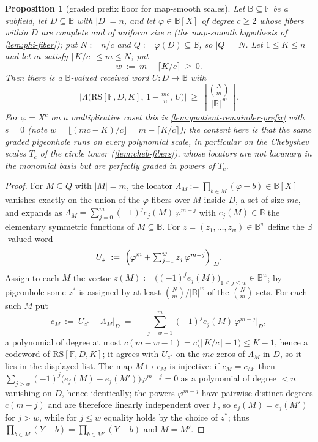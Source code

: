 \documentclass[11pt]{article}
\newtheorem{proposition}[proposition]{Proposition}
\theoremstyle{definition}
\theoremstyle{remark}
\newcommand{\F}{\mathbb{F}}
\newcommand{\B}{\mathbb{B}}
\newcommand{\RS}{\mathrm{RS}}
\newcommand{\Lst}{\Lambda}
\begin{document}
\begin{proposition}[graded prefix floor for map-smooth scales]\label{prop:graded-prefix-floor}
Let $\B\subseteq\F$ be a subfield, let $D\subseteq\B$ with $|D|=n$, and let $\varphi\in\B[X]$ of degree $c\ge2$ whose fibers within $D$ are complete and of uniform size $c$ (the map-smooth hypothesis of \cref{lem:phi-fiber}); put $N:=n/c$ and $Q:=\varphi(D)\subseteq\B$, so $|Q|=N$. Let $1\le K\le n$ and let $m$ satisfy $\lceil K/c\rceil\le m\le N$; put
\[
w\ :=\ m-\lceil K/c\rceil\ \ge\ 0 .
\]
Then there is a $\B$-valued received word $U:D\to\B$ with
\[
\bigl|\Lst\bigl(\RS[\F,D,K],\,1-\tfrac{mc}{n},\,U\bigr)\bigr|
\ \ge\
\left\lceil\frac{\binom Nm}{|\B|^{\,w}}\right\rceil .
\]
For $\varphi=X^c$ on a multiplicative coset this is \cref{lem:quotient-remainder-prefix} with $s=0$ (note $w=\lfloor(mc-K)/c\rfloor=m-\lceil K/c\rceil$); the content here is that the same graded pigeonhole runs on every polynomial scale, in particular on the Chebyshev scales $T_c$ of the circle tower (\cref{lem:cheb-fibers}), whose locators are not lacunary in the monomial basis but are perfectly graded in powers of $T_c$.
\end{proposition}

\begin{proof}
For $M\subseteq Q$ with $|M|=m$, the locator $\Lambda_M:=\prod_{b\in M}(\varphi-b)\in\B[X]$ vanishes exactly on the union of the $\varphi$-fibers over $M$ inside $D$, a set of size $mc$, and expands as $\Lambda_M=\sum_{j=0}^m(-1)^je_j(M)\,\varphi^{m-j}$ with $e_j(M)\in\B$ the elementary symmetric functions of $M\subseteq\B$. For $z=(z_1,\dots,z_w)\in\B^w$ define the $\B$-valued word
\[
U_z\ :=\ \Bigl(\varphi^m+\textstyle\sum_{j=1}^{w}z_j\,\varphi^{m-j}\Bigr)\Big|_D .
\]
Assign to each $M$ the vector $z(M):=\bigl((-1)^je_j(M)\bigr)_{1\le j\le w}\in\B^w$; by pigeonhole some $z^*$ is assigned by at least $\binom Nm/|\B|^w$ of the $\binom Nm$ sets. For each such $M$ put
\[
c_M\ :=\ U_{z^*}-\Lambda_M\big|_D\ =\ -\sum_{j=w+1}^{m}(-1)^je_j(M)\,\varphi^{m-j}\Big|_D ,
\]
a polynomial of degree at most $c(m-w-1)=c\bigl(\lceil K/c\rceil-1\bigr)\le K-1$, hence a codeword of $\RS[\F,D,K]$; it agrees with $U_{z^*}$ on the $mc$ zeros of $\Lambda_M$ in $D$, so it lies in the displayed list. The map $M\mapsto c_M$ is injective: if $c_M=c_{M'}$ then $\sum_{j>w}(-1)^j\bigl(e_j(M)-e_j(M')\bigr)\varphi^{m-j}=0$ as a polynomial of degree $<n$ vanishing on $D$, hence identically; the powers $\varphi^{m-j}$ have pairwise distinct degrees $c(m-j)$ and are therefore linearly independent over $\F$, so $e_j(M)=e_j(M')$ for $j>w$, while for $j\le w$ equality holds by the choice of $z^*$; thus $\prod_{b\in M}(Y-b)=\prod_{b\in M'}(Y-b)$ and $M=M'$.
\end{proof}
\end{document}
